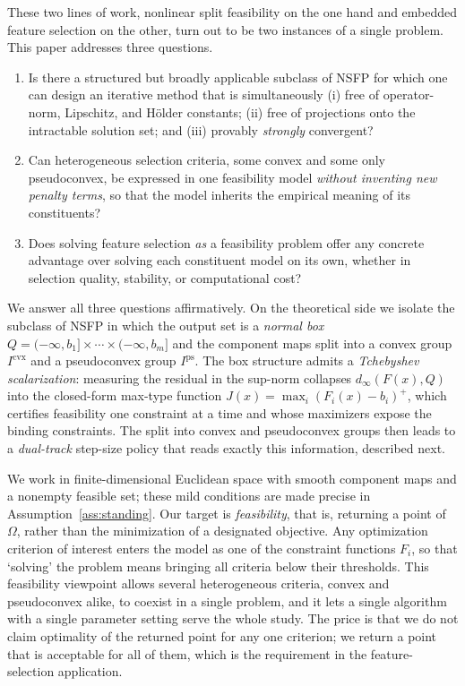 \documentclass[]{interact}
\theoremstyle{plain}
\theoremstyle{definition}
\theoremstyle{remark}
\newcommand{\cvx}{\mathrm{cvx}}
\newcommand{\ps}{\mathrm{ps}}
\begin{document}
These two lines of work, nonlinear split feasibility on the one hand and embedded feature selection on the other, turn out to be two instances of a single problem. This paper addresses three questions.
\begin{enumerate}[label=\textbf{(Q\arabic*)},leftmargin=2.6em]
\item Is there a structured but broadly applicable subclass of NSFP for which one can design an iterative method that is simultaneously (i) free of operator-norm, Lipschitz, and H\"older constants; (ii) free of projections onto the intractable solution set; and (iii) provably \emph{strongly} convergent?
\item Can heterogeneous selection criteria, some convex and some only pseudoconvex, be expressed in one feasibility model \emph{without inventing new penalty terms}, so that the model inherits the empirical meaning of its constituents?
\item Does solving feature selection \emph{as} a feasibility problem offer any concrete advantage over solving each constituent model on its own, whether in selection quality, stability, or computational cost?
\end{enumerate}

We answer all three questions affirmatively. On the theoretical side we isolate the subclass of NSFP in which the output set is a \emph{normal box} $Q=(-\infty,b_1]\times\cdots\times(-\infty,b_m]$ and the component maps split into a convex group $I^{\cvx}$ and a pseudoconvex group $I^{\ps}$. The box structure admits a \emph{Tchebyshev scalarization}: measuring the residual in the sup-norm collapses $d_\infty(F(x),Q)$ into the closed-form max-type function $J(x)=\max_i (F_i(x)-b_i)^+$, which certifies feasibility one constraint at a time and whose maximizers expose the binding constraints. The split into convex and pseudoconvex groups then leads to a \emph{dual-track} step-size policy that reads exactly this information, described next.

We work in finite-dimensional Euclidean space with smooth component maps and a nonempty feasible set; these mild conditions are made precise in Assumption~\ref{ass:standing}. Our target is \emph{feasibility}, that is, returning a point of $\Omega$, rather than the minimization of a designated objective. Any optimization criterion of interest enters the model as one of the constraint functions $F_i$, so that `solving' the problem means bringing all criteria below their thresholds. This feasibility viewpoint allows several heterogeneous criteria, convex and pseudoconvex alike, to coexist in a single problem, and it lets a single algorithm with a single parameter setting serve the whole study. The price is that we do not claim optimality of the returned point for any one criterion; we return a point that is acceptable for all of them, which is the requirement in the feature-selection application.
\end{document}
